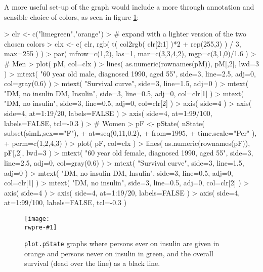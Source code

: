 \documentclass[a4paper,twoside,12pt]{report}
\newcommand{\rwpre}{sL}
\newcommand{\insfig}[3]{
\begin{figure}[h]
  \centering
  \texttt{[image: \\rwpre-\#1]}
  \caption{#3}
  \label{fig:#1}
\end{figure}}
\begin{document}
A more useful set-up of the graph would include a more through
annotation and sensible choice of colors, as seen in figure \ref{fig:pstatex}:
\begin{Schunk}
\begin{Sinput}
> clr <- c("limegreen","orange")
> # expand with a lighter version of the two chosen colors
> clx <- c( clr, rgb( t( col2rgb( clr[2:1] )*2 + rep(255,3) ) / 3, max=255 ) )
> par( mfrow=c(1,2), las=1, mar=c(3,3,4,2), mgp=c(3,1,0)/1.6 )
> # Men
> plot( pM, col=clx )
> lines( as.numeric(rownames(pM)), pM[,2], lwd=3 )
> mtext( "60 year old male, diagnosed 1990, aged 55", side=3, line=2.5, adj=0, col=gray(0.6) )
> mtext( "Survival curve", side=3, line=1.5, adj=0 )
> mtext( "DM, no insulin   DM, Insulin", side=3, line=0.5, adj=0, col=clr[1] )
> mtext( "DM, no insulin", side=3, line=0.5, adj=0, col=clr[2] )
> axis( side=4 )
> axis( side=4, at=1:19/20, labels=FALSE )
> axis( side=4, at=1:99/100, labels=FALSE, tcl=-0.3 )
> # Women
> pF <- pState( nState( subset(simL,sex=="F"),
+                       at=seq(0,11,0.2),
+                       from=1995,
+                       time.scale="Per" ),
+               perm=c(1,2,4,3) )
> plot( pF, col=clx )
> lines( as.numeric(rownames(pF)), pF[,2], lwd=3 )
> mtext( "60 year old female, diagnosed 1990, aged 55", side=3, line=2.5, adj=0, col=gray(0.6) )
> mtext( "Survival curve", side=3, line=1.5, adj=0 )
> mtext( "DM, no insulin   DM, Insulin", side=3, line=0.5, adj=0, col=clr[1] )
> mtext( "DM, no insulin", side=3, line=0.5, adj=0, col=clr[2] )
> axis( side=4 )
> axis( side=4, at=1:19/20, labels=FALSE )
> axis( side=4, at=1:99/100, labels=FALSE, tcl=-0.3 )
\end{Sinput}
\end{Schunk}
\insfig{pstatex}{1.0}{\textrm{\tt plot.pState} graphs where persons
  ever on insulin are given in orange and persons never on insulin in
  green, and the overall survival (dead over the line) as a black line.}
\end{document}
